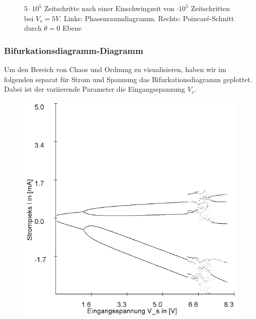 \documentclass[12pt,a4paper]{article}
\begin{document}
\begin{figure}[!htbp]
\caption{$5\cdot10^5$ Zeitschritte nach einer Einschwingzeit von $\cdot10^5$ Zeitschritten bei $V_s=5V$. Links: Phasenraumdiagramm. Rechts: Poincaré-Schnitt durch $\theta=0$ Ebene}
\label{fig:ldr-poin1}
\end{figure}

\subsubsection{Bifurkationsdiagramm-Diagramm}
Um den Bereich von Chaos und Ordnung zu visualisieren, haben wir im folgenden separat für Strom und Spannung das Bifurkationsdiagramm geplottet. Dabei ist der variierende Parameter die Eingangsspannung $V_s$.
\begin{figure}[!htbp]
\includegraphics[scale=0.4]{schwing-bifurc-von-0-8-in-0,01schritten-400k-strom}

\end{figure}
\end{document}
